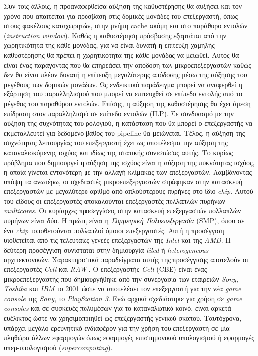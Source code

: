 Συν τοις άλλοις, η προαναφερθείσα αύξηση της καθυστέρησης θα αυξήσει και τον χρόνο που απαιτείται για πρόσβαση στις δομικές μονάδες του επεξεργαστή, όπως στους φακέλους καταχωρητών, στην μνήμη cache ακόμη και στο παράθυρο εντολών (\textsl{instruction window}). Καθώς η καθυστέρηση πρόσβασης εξαρτάται από την χωρητικότητα της κάθε μονάδας, για να είναι δυνατή η επίτευξη χαμηλής καθυστέρησης θα πρέπει η χωρητικότητα της κάθε μονάδας να μειωθεί. Αυτός θα είναι ένας παράγοντας που θα επηρεάσει την απόδοση των μικροεπεξεργαστών καθώς δεν θα είναι πλέον δυνατή η επίτευξη μεγαλύτερης απόδοσης μέσω της αύξησης του μεγέθους των δομικών μονάδων. Ως ενδεικτικό παράδειγμα μπορεί να αναφερθεί η εξάρτηση του παραλληλισμού που μπορεί να επιτευχθεί σε επίπεδο εντολής από το μέγεθος του παραθύρου εντολών.\newline \indent
Επίσης, η αύξηση της καθυστέρησης θα έχει άμεση επίδραση στον παραλληλισμό σε επίπεδο εντολών (ILP). Σε συνδυασμό με την αύξηση της συχνότητας του ρολογιού, η κατάσταση που θα μπορεί ο επεξεργαστής να εκμεταλλευτεί για δεδομένο βάθος του pipeline θα μειώνεται. Τέλος, η αύξηση της συχνότητας λειτουργίας του επεξεργαστή έχει ως αποτέλεσμα την αύξηση της καταναλισκόμενης ισχύος και ιδίως της στατικής συνιστώσας αυτής. Το κυρίως πρόβλημα που δημιουργεί η αύξηση της ισχύος είναι η αύξηση της πυκνότητας ισχύος, η οποία γίνεται εντονότερη με την αλλαγή κλίμακας των επεξεργαστών.\newline \indent
Λαμβάνοντας υπόψη τα ανωτέρω, οι σχεδιαστές μικροεπεξεργαστών στράφηκαν στην κατασκευή επεξεργαστών με μεγαλύτερο αριθμό από απλούστερους πυρήνες στο ίδιο \textsl{chip}. Αυτού του είδους οι επεξεργαστές αποκαλούνται επεξεργαστές πολλαπλών πυρήνων - \textsl{multicores}. Οι κυρίαρχες προσεγγίσεις στην  κατασκευή επεξεργαστών πολλαπλών πυρήνων είναι δύο. Η πρώτη είναι η \textsl{Συμμετρική Πολυεπεξεργασία} (\ac{SMP}), όπου σε ένα \textsl{chip} τοποθετούνται πολλαπλοί όμοιοι επεξεργαστές. Αυτή η προσέγγιση υιοθετείται από τις τελευταίες γενεές επεξεργαστών της \textsl{Intel} και της \textsl{AMD}. Η δεύτερη προσέγγιση συνίσταται στην δημιουργία \textsl{tiled} ή \textsl{heterogeneous} αρχιτεκτονικών. Χαρακτηριστικά παραδείγματα αυτής της προσέγγισης αποτελούν οι επεξεργαστές \textsl{Cell} \cite{Hofstee} και \textsl{RAW} \cite{Waingold, Taylor}.
\newline \indent
Ο επεξεργαστής \textsl{Cell} (\ac{CBE}) είναι ένας μικροεπεξεργαστής που δημιουργήθηκε από την συνεργασία των εταιρειών \textsl{Sony, Toshiba} και \textsl{IBM} το 2001 ώστε να αποτελέσει τον επεξεργαστή για την νέα \textsl{game console} της \textsl{Sony}, το \textsl{PlayStation 3}. Ενώ αρχικά σχεδιάστηκε για χρήση σε \textsl{game consoles} και σε συσκευές πολυμέσων για το καταναλωτικό κοινό, είναι αρκετά ευέλικτος ώστε να χρησιμοποιηθεί ως επεξεργαστής γενικού σκοπού. Ταυτόχρονα, υπάρχει μεγάλο ερευνητικό ενδιαφέρον για την χρήση του επεξεργαστή σε μία πληθώρα άλλων εφαρμογών όπως εφαρμογές επιστημονικού υπολογισμού ή εφαρμογές υπερ-υπολογισμού (\textsl{supercomputing}).\newline \indent
